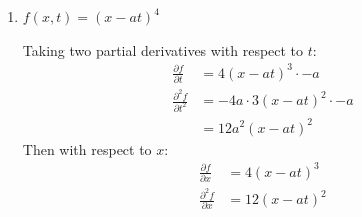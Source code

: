 \documentclass[11pt]{article}
\begin{document}
\begin{enumerate}[label=\textbf{\arabic*.}]
{\begin{enumerate}[label=\textbf{(\alph*)}]
{                    \textbf{\boldmath \(f(x,t)=e^{-at}\sin(x)\)}
                    \par
                    Taking two partial derivatives with respect to \(t\):
                    \begin{align*}
                        \frac{\partial f}{\partial t}&=\sin(x)\cdot-ae^{-at} \\
                        \frac{\partial^2f}{\partial t^2}&=-a\sin(x)\cdot-ae^{-at} \\
                        &=a^2e^{-at}\sin(x)
                    \end{align*}
                    Then with respect to \(x\):
                    \begin{align*}
                        \frac{\partial f}{\partial x}&=e^{-at}\cos(x) \\
                        \frac{\partial^2f}{\partial x}&=e^{-at}\cdot-\sin(x) \\
                        &=-e^{-at}\sin(x)
                    \end{align*}
                    Then,
                    \begin{align*}
                        f_{tt}(x,t)&\stackrel{?}{=}a^2f_{xx}(x,t) \\
                        a^2e^{-at}\sin(x)&\stackrel{?}{=}a^2(-e^{-at}\sin(x)) \\
                        a^2e^{-at}\sin(x)&\neq-a^2e^{-at}\sin(x)
                    \end{align*}
                    so \(f(x,t)=e^{-at}\sin(x)\) is not a solution.
                }
                \item{
                    \textbf{\boldmath \(f(x,t)=(x-at)^4\)}
                    \par
                    Taking two partial derivatives with respect to \(t\):
                    \begin{align*}
                        \frac{\partial f}{\partial t}&=4(x-at)^3\cdot-a \\
                        \frac{\partial^2f}{\partial t^2}&=-4a\cdot3(x-at)^2\cdot-a \\
                        &=12a^2(x-at)^2
                    \end{align*}
                    Then with respect to \(x\):
                    \begin{align*}
                        \frac{\partial f}{\partial x}&=4(x-at)^3 \\
                        \frac{\partial^2f}{\partial x}&=12(x-at)^2

\end{align*}}
\end{enumerate}}
\end{enumerate}
\end{document}
